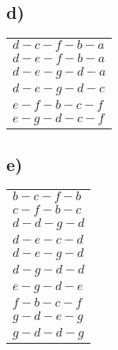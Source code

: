 \documentclass[11pt]{article}
\begin{document}
\subsection*{d)}
\begin{table}[H]
    \begin{tabular}{l}
        $d-c-f-b-a$\\
        $d-e-f-b-a$\\
        $d-e-g-d-a$\\
        $d-e-g-d-c$\\
        $e-f-b-c-f$\\
        $e-g-d-c-f$\\
    \end{tabular}
\end{table}
\subsection*{e)}
\begin{table}[H]
    \begin{tabular}{l}
        $b-c-f-b$\\
        $c-f-b-c$\\
        $d-d-g-d$\\
        $d-e-c-d$\\
        $d-e-g-d$\\
        $d-g-d-d$\\
        $e-g-d-e$\\
        $f-b-c-f$\\
        $g-d-e-g$\\
        $g-d-d-g$\\
    \end{tabular}
\end{table}
\end{document}
